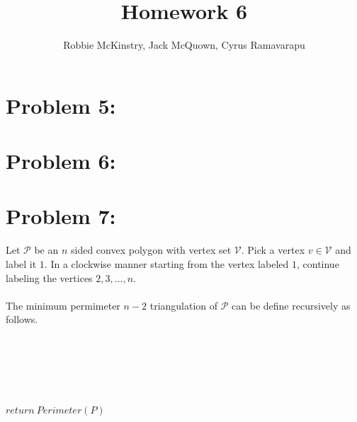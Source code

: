 \documentclass[12pt]{article}
\begin{document}
\title{Homework 6}
\author{Robbie McKinstry, Jack McQuown, Cyrus Ramavarapu}
\renewcommand{\today}{15 September 2016}
\renewcommand{\baselinestretch}{1.5}
\maketitle

\section*{Problem 5: }
\section*{Problem 6: }
\section*{Problem 7: }
Let $\mathcal{P}$ be an $n$ sided convex polygon with vertex set
$\mathcal{V}$.  Pick a vertex $v\in\mathcal{V}$ and label it $1$.
In a clockwise manner starting from the vertex labeled $1$, continue
labeling the vertices $2,3,\dots,n$.\\\\
The minimum permimeter $n-2$ triangulation of $\mathcal{P}$ can be
define recursively as follows.\\\\
\begin{algorithm}[H]
\\
\\
\\
\\
{$return\ Perimeter(P)$}
\end{algorithm}
\end{document}
